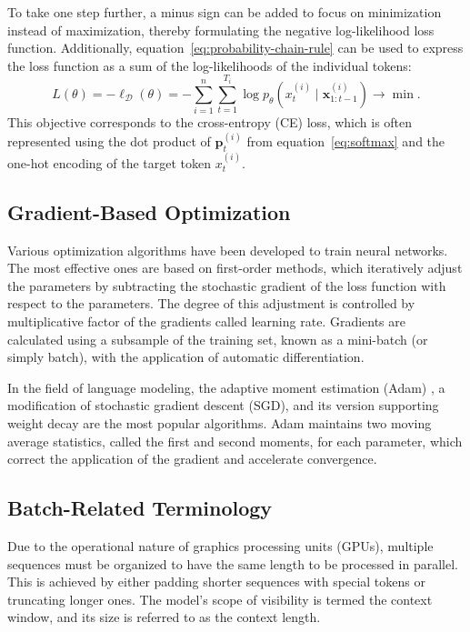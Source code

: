 To take one step further, a minus sign can be added to focus on minimization instead of maximization, thereby formulating the negative log-likelihood loss function. Additionally, equation~\ref{eq:probability-chain-rule} can be used to express the loss function as a sum of the log-likelihoods of the individual tokens:
\begin{equation}
	L(\theta) = -\ell_{\mathcal{D}}(\theta) = -\sum_{i=1}^{n} \sum_{t=1}^{T_i} \log p_{\theta}(x^{(i)}_t \mid \bm{x}^{(i)}_{1:t-1}) \rightarrow \min.
\end{equation}
This objective corresponds to the cross-entropy (CE) loss, which is often represented using the dot product of \(\mathbf{p}^{(i)}_t\) from equation~\ref{eq:softmax} and the one-hot encoding of the target token \(x^{(i)}_t\).

\subsection{Gradient-Based Optimization}

Various optimization algorithms have been developed to train neural networks. The most effective ones are based on first-order methods, which iteratively adjust the parameters by subtracting the stochastic gradient of the loss function with respect to the parameters. The degree of this adjustment is controlled by multiplicative factor of the gradients called learning rate. Gradients are calculated using a subsample of the training set, known as a mini-batch (or simply batch), with the application of automatic differentiation.

In the field of language modeling, the adaptive moment estimation (Adam) \parencite{kingma2014}, a modification of stochastic gradient descent (SGD), and its version supporting weight decay \parencite{loshchilov2017} are the most popular algorithms. Adam maintains two moving average statistics, called the first and second moments, for each parameter, which correct the application of the gradient and accelerate convergence.

\subsection{Batch-Related Terminology}

Due to the operational nature of graphics processing units (GPUs), multiple sequences must be organized to have the same length to be processed in parallel. This is achieved by either padding shorter sequences with special tokens or truncating longer ones. The model's scope of visibility is termed the context window, and its size is referred to as the context length.

